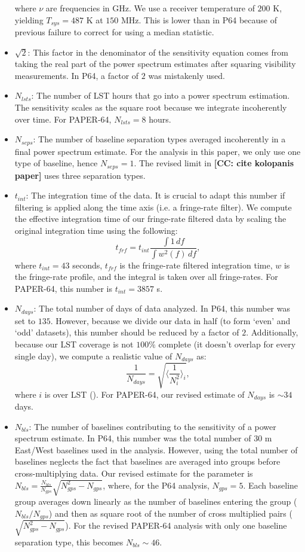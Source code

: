 \documentclass[preprint2,numberedappendix,tighten]{aastex6}  %
\newcommand{\cc}[1]{{\color{purple} \textbf{[CC: #1]}}}
\begin{document}
\begin{itemize}
where $\nu$ are frequencies in GHz. We use a receiver temperature of $200$ K, yielding $T_{sys} = 487$ K at $150$ MHz. This is lower than in P64 because of previous failure to correct for using a median statistic.
\item $\sqrt{2}$: This factor in the denominator of the sensitivity equation comes from taking the real part of the power spectrum estimates after squaring visibility measurements. In P64, a factor of $2$ was mistakenly used.
\item $N_{lsts}$: The number of LST hours that go into a power spectrum estimation. The sensitivity scales as the square root because we integrate incoherently over time. For PAPER-64, $N_{lsts} = 8$ hours.
\item $N_{seps}$: The number of baseline separation types averaged incoherently in a final power spectrum estimate. For the analysis in this paper, we only use one type of baseline, hence $N_{seps}=1$. The revised limit in \cc{cite kolopanis paper} uses three separation types.
\item $t_{int}$: The integration time of the data. It is crucial to adapt this number if filtering is applied along the time axis (i.e. a fringe-rate filter). We compute the effective integration time of our fringe-rate filtered data by scaling the original integration time using the following:
\begin{equation}
t_{frf} = t_{int} \frac{\int1 \, df}{\int w^{2}(f) \,df},
\end{equation}
where $t_{int}=43$ seconds, $t_{frf}$ is the fringe-rate filtered integration time, $w$ is the fringe-rate profile, and the integral is taken over all fringe-rates. For PAPER-64, this number is $t_{int} = 3857$ s. 
\item $N_{days}$: The total number of days of data analyzed. In P64, this number was set to $135$. However, because we divide our data in half (to form `even' and `odd' datasets), this number should be reduced by a factor of $2$. Additionally, because our LST coverage is not $100\%$ complete (it doesn't overlap for every single day), we compute a realistic value of $N_{days}$ as:
\begin{equation}
 \frac{1}{N_{days}} = \sqrt{\Big\langle\frac{1}{N_{i}^{2}} \Big\rangle_{i}},
 \end{equation}
\noindent where $i$ is over LST (\citealt{jacobs_et_al2015}). For PAPER-64, our revised estimate of $N_{days}$ is $\sim34$ days.
\item $N_{bls}$: The number of baselines contributing to the sensitivity of a power spectrum estimate. In P64, this number was the total number of $30$ m East/West baselines used in the analysis. However, using the total number of baselines neglects the fact that baselines are averaged into groups before cross-multiplying data. Our revised estimate for the parameter is $N_{bls} = \frac{N_{bls}}{N_{gps}}\sqrt{N_{gps}^{2}-N_{gps}}$, where, for the P64 analysis, $N_{gps} = 5$. Each baseline group averages down linearly as the number of baselines entering the group ($N_{bls}/N_{gps}$) and then as square root of the number of cross multiplied pairs ($\sqrt{N_{gps}^{2} - N_{gps}}$). For the revised PAPER-64 analysis with only one baseline separation type, this becomes $N_{bls} \sim 46$. 

\end{itemize}
\end{document}
